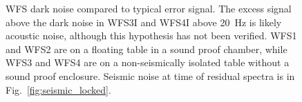 \begin{figure}
\begin{centering}
\caption[WFS error signal and dark noise]{WFS dark noise compared to typical error signal. The excess signal above the dark noise in WFS3I and WFS4I above 20~Hz is likely acoustic noise, although this hypothesis has not been verified. WFS1 and WFS2 are on a floating table in a sound proof chamber, while WFS3 and WFS4 are on a non-seismically isolated table without a sound proof enclosure. Seismic noise at time of residual spectra is in Fig.~\ref{fig:seismic_locked}.}
\label{fig:WFSdarknoise}
\end{centering}
\end{figure}







